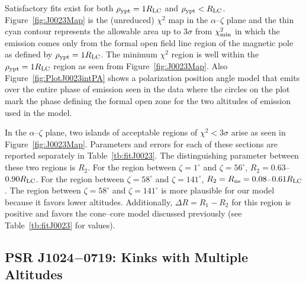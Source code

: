 Satisfactory fits exist for both $\rho_{\rm{ypt}}= 1 R_{\rm{LC}}$ and $\rho_{\rm{ypt}}<R_{\rm{LC}}$.
Figure~\ref{fig:J0023Map} is the (unreduced) $\chi^{2}$ map in the $\alpha$--$\zeta$ plane and
the thin cyan contour represents the allowable area up to $3\sigma$ from $\chi^{2}_{\rm{min}}$ in
which the emission comes only from the formal open field line region of the magnetic pole 
as defined by $\rho_{\rm{ypt}}=1R_{\rm{LC}}$.
The minimum $\chi^2$ region is well within the $\rho_{\rm{ypt}}=1R_{\rm{LC}}$ region as seen from Figure~\ref{fig:J0023Map}.
Also Figure~\ref{fig:PlotJ0023intPA} shows a polarization position angle model that 
emits over the entire phase of emission seen in the data where the circles on the plot mark the phase defining
the formal open zone for the two altitudes of emission used in the model.





In the $\alpha$--$\zeta$ plane, two islands of acceptable regions of $\chi^2<3\sigma$ arise as seen in Figure~\ref{fig:J0023Map}.  
Parameters and errors for each of these sections are reported separately in Table~\ref{tb:fitJ0023}.
The distinguishing parameter
between these two regions is $R_{2}$.  For the region between $\zeta=1^{\circ}$ and $\zeta=56^{\circ}$,
$R_{2}=0.63$--$0.90R_{\rm{LC}}$.  For the region between $\zeta=58^{\circ}$ and $\zeta=141^{\circ}$,
$R_{2}=R_{\rm{ns}}=0.08$--$0.61R_{\rm{LC}}$.  
The region between $\zeta=58^{\circ}$ and $\zeta=141^{\circ}$
is more plausible for our model because it favors lower altitudes.  
Additionally, $\Delta R=R_{1}-R_{2}$ for
this region is positive and favors the cone--core model discussed previously (see Table~\ref{tb:fitJ0023}
for values).






\subsection{PSR J1024$-$0719: Kinks with Multiple Altitudes}
\label{sec:J1024}



